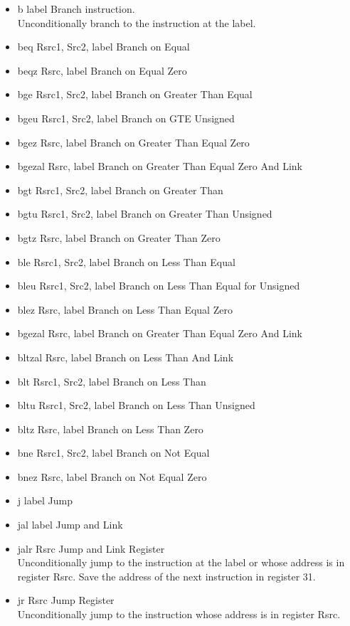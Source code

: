 \documentclass[a4paper, 11pt]{article}
\begin{document}
	\begin{itemize}
		\item b label	\hfill Branch instruction. \\
			Unconditionally branch to the instruction at the label.
		\item beq Rsrc1, Src2, label	\hfill Branch on Equal
		\item beqz Rsrc, label	\hfill Branch on Equal Zero
		\item bge Rsrc1, Src2, label	\hfill Branch on Greater Than Equal
		\item bgeu Rsrc1, Src2, label	\hfill Branch on GTE Unsigned
		\item bgez Rsrc, label	\hfill Branch on Greater Than Equal Zero
		\item bgezal Rsrc, label	\hfill Branch on Greater Than Equal Zero And Link
		\item bgt Rsrc1, Src2, label	\hfill Branch on Greater Than
		\item bgtu Rsrc1, Src2, label	\hfill Branch on Greater Than Unsigned
		\item bgtz Rsrc, label	\hfill Branch on Greater Than Zero
		\item ble Rsrc1, Src2, label	\hfill Branch on Less Than Equal
		\item bleu Rsrc1, Src2, label	\hfill Branch on Less Than Equal for Unsigned
		\item blez Rsrc, label	\hfill Branch on Less Than Equal Zero
		\item bgezal Rsrc, label	\hfill Branch on Greater Than Equal Zero And Link
		\item bltzal Rsrc, label	\hfill Branch on Less Than And Link
		\item blt Rsrc1, Src2, label	\hfill Branch on Less Than
		\item bltu Rsrc1, Src2, label	\hfill Branch on Less Than Unsigned
		\item bltz Rsrc, label	\hfill Branch on Less Than Zero
		\item bne Rsrc1, Src2, label	\hfill Branch on Not Equal
		\item bnez Rsrc, label	\hfill Branch on Not Equal Zero
		\item j label	\hfill Jump
		\item jal label	\hfill Jump and Link
		\item jalr Rsrc	\hfill Jump and Link Register \\
			Unconditionally jump to the instruction at the label or whose address is in register Rsrc. Save the address of the next instruction in register 31.
		\item jr Rsrc	\hfill Jump Register \\
			Unconditionally jump to the instruction whose address is in register Rsrc.
	\end{itemize}
\end{document}
